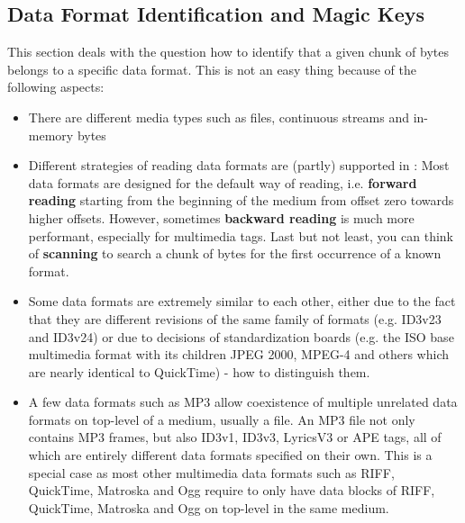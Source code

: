 \subsection{Data Format Identification and Magic Keys}%
\label{sec:MagicKeys}%

This section deals with the question how to identify that a given chunk of bytes belongs to a specific data format. This is not an easy thing because of the following aspects:
\begin{itemize}
\item There are different media types such as files, continuous streams and in-memory bytes
\item Different strategies of reading data formats are (partly) supported in \LibName{}: Most data formats are designed for the default way of reading, i.e. \textbf{forward reading} starting from the beginning of the medium from offset zero towards higher offsets. However, sometimes \textbf{backward reading} is much more performant, especially for multimedia tags. Last but not least, you can think of \textbf{scanning} to search a chunk of bytes for the first occurrence of a known format.
\item Some data formats are extremely similar to each other, either due to the fact that they are different revisions of the same family of formats (e.g. ID3v23 and ID3v24) or due to decisions of standardization boards (e.g. the ISO base multimedia format with its children JPEG 2000, MPEG-4 and others which are nearly identical to QuickTime) - how to distinguish them.
\item A few data formats such as MP3 allow coexistence of multiple unrelated data formats on top-level of a medium, usually a file. An MP3 file not only contains MP3 frames, but also ID3v1, ID3v3, LyricsV3 or APE tags, all of which are entirely different data formats specified on their own. This is a special case as most other multimedia data formats such as RIFF, QuickTime, Matroska and Ogg require to only have data blocks of RIFF, QuickTime, Matroska and Ogg on top-level in the same medium.
\end{itemize}

